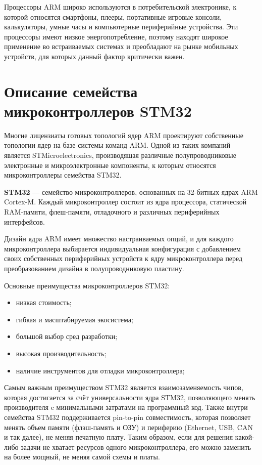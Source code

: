 Процессоры ARM широко используются в потребительской электронике, к которой относятся смартфоны, плееры, портативные игровые консоли, калькуляторы, умные часы и компьютерные периферийные устройства. Эти процессоры имеют низкое энергопотребление, поэтому находят широкое применение во встраиваемых системах и преобладают на рынке мобильных устройств, для которых данный фактор критически важен. \cite{ARM_consumers}

\section{Описание семейства микроконтроллеров STM32}
Многие лицензиаты готовых топологий ядер ARM проектируют собственные топологии ядер на базе системы команд ARM. Одной из таких компаний является STMicroelectronics, производящая различные полупроводниковые электронные и микроэлектронные компоненты, к которым относятся микроконтроллеры семейства STM32.

\textbf{STM32} — семейство микроконтроллеров, основанных на 32-битных ядрах ARM Cortex-M. Каждый микроконтроллер состоит из ядра процессора, статической RAM-памяти, флеш-памяти, отладочного и различных периферийных интерфейсов.

Дизайн ядра ARM имеет множество настраиваемых опций, и для каждого микроконтроллера выбирается индивидуальная конфигурация с добавлением своих собственных периферийных устройств к ядру микроконтроллера перед преобразованием дизайна в полупроводниковую пластину.

Основные преимущества микроконтроллеров STM32:
\begin{itemize}
	\item низкая стоимость;
	\item гибкая и масштабируемая экосистема;
	\item большой выбор сред разработки;
	\item высокая производительность;
	\item наличие инструментов для отладки микроконтроллера;
\end{itemize}

Самым важным преимуществом STM32 является взаимозаменяемость чипов, которая достигается за счёт универсальности ядра STM32, позволяющего менять производителя c минимальными затратами на программный код. Также внутри семейства STM32 поддерживается pin-to-pin совместимость, которая позволяет менять объем памяти (флэш-память и ОЗУ) и периферию (Ethernet, USB, CAN и так далее), не меняя печатную плату. Таким образом, если для решения какой-либо задачи не хватает ресурсов одного микроконтроллера, его можно заменить на более мощный, не меняя самой схемы и платы. \cite{STM32_advantages}

